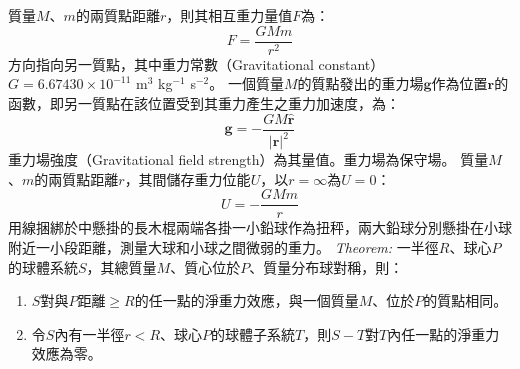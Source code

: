 \documentclass[a4paper,12pt]{article}
\begin{document}
質量$M$、$m$的兩質點距離$r$，則其相互重力量值$F$為：
\[F=\frac{GMm}{r^2}\]
方向指向另一質點，其中重力常數（Gravitational constant） $G = 6.67430\times 10^{-11}$ m$^3$ kg$^{-1}$ s$^{-2}$。
一個質量$M$的質點發出的重力場$\mathbf{g}$作為位置$\mathbf{r}$的函數，即另一質點在該位置受到其重力產生之重力加速度，為：
\[\mathbf{g}=-\frac{GM\hat{\mathbf{r}}}{|\mathbf{r}|^2}\]
重力場強度（Gravitational field strength）為其量值。重力場為保守場。
質量$M$、$m$的兩質點距離$r$，其間儲存重力位能$U$，以$r=\infty$為$U=0$：
\[U=-\frac{GMm}{r}\]
用線捆綁於中懸掛的長木棍兩端各掛一小鉛球作為扭秤，兩大鉛球分別懸掛在小球附近一小段距離，測量大球和小球之間微弱的重力。
\textit{Theorem:} 一半徑$R$、球心$P$的球體系統$S$，其總質量$M$、質心位於$P$、質量分布球對稱，則：
\begin{enumerate}
\item $S$對與$P$距離$\geq R$的任一點的淨重力效應，與一個質量$M$、位於$P$的質點相同。
\item 令$S$內有一半徑$r<R$、球心$P$的球體子系統$T$，則$S-T$對$T$內任一點的淨重力效應為零。
\end{enumerate}
\end{document}
